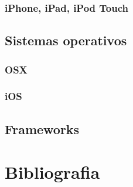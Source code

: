 		\subsection{iPhone, iPad, iPod Touch}
	\section{Sistemas operativos}
		\subsection{OSX}
		\subsection{iOS}
	\section{Frameworks}
	
\chapter{Bibliografia}
